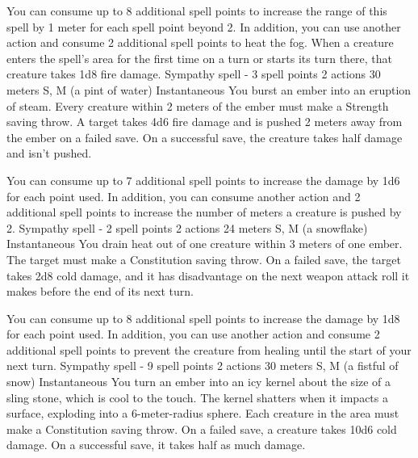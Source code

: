         You can consume up to 8 additional spell points to increase the range of this spell by 1 meter for each spell point beyond 2.
        In addition, you can use another action and consume 2 additional spell points to heat the fog.
        When a creature enters the spell's area for the first time on a turn or starts its turn there, that creature takes 1d8 fire damage.
        {Sympathy spell - 3 spell points}
        {2 actions}
        {30 meters}
        {S, M (a pint of water)}
        {Instantaneous}
        You burst an ember into an eruption of steam.
        Every creature within 2 meters of the ember must make a Strength saving throw.
        A target takes 4d6 fire damage and is pushed 2 meters away from the ember on a failed save.
        On a successful save, the creature takes half damage and isn't pushed.

        You can consume up to 7 additional spell points to increase the damage by 1d6 for each point used.
        In addition, you can consume another action and 2 additional spell points to increase the number of meters a creature is pushed by 2.
        {Sympathy spell - 2 spell points}
        {2 actions}
        {24 meters}
        {S, M (a snowflake)}
        {Instantaneous}
        You drain heat out of one creature within 3 meters of one ember.
        The target must make a Constitution saving throw.
        On a failed save, the target takes 2d8 cold damage, and it has disadvantage on the next weapon attack roll it makes before the end of its next turn.

        You can consume up to 8 additional spell points to increase the damage by 1d8 for each point used.
        In addition, you can use another action and consume 2 additional spell points to prevent the creature from healing until the start of your next turn.
        {Sympathy spell - 9 spell points}
        {2 actions}
        {30 meters}
        {S, M (a fistful of snow)}
        {Instantaneous}
        You turn an ember into an icy kernel about the size of a sling stone, which is cool to the touch.
        The kernel shatters when it impacts a surface, exploding into a 6-meter-radius sphere.
        Each creature in the area must make a Constitution saving throw.
        On a failed save, a creature takes 10d6 cold damage.
        On a successful save, it takes half as much damage.

